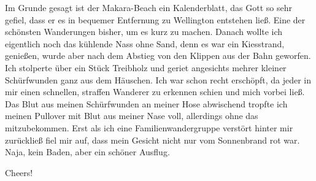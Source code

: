 Im Grunde gesagt ist der Makara-Beach ein Kalenderblatt, das Gott so
sehr gefiel, dass er es in bequemer Entfernung zu Wellington entstehen
ließ. Eine der schönsten Wanderungen bisher, um es kurz zu machen.
Danach wollte ich eigentlich noch das kühlende Nass ohne Sand, denn es
war ein Kiesstrand, genießen, wurde aber nach dem Abstieg von den
Klippen aus der Bahn geworfen. Ich stolperte über ein Stück Treibholz
und geriet angesichts mehrer kleiner Schürfwunden ganz aus dem Häuschen.
Ich war schon recht erschöpft, da jeder in mir einen schnellen, straffen
Wanderer zu erkennen schien und mich vorbei ließ. Das Blut aus meinen
Schürfwunden an meiner Hose abwischend tropfte ich meinen Pullover mit
Blut aus meiner Nase voll, allerdings ohne das mitzubekommen. Erst als
ich eine Familienwandergruppe verstört hinter mir zurückließ fiel mir
auf, dass mein Gesicht nicht nur vom Sonnenbrand rot war. Naja, kein
Baden, aber ein schöner Ausflug.

Cheers!
